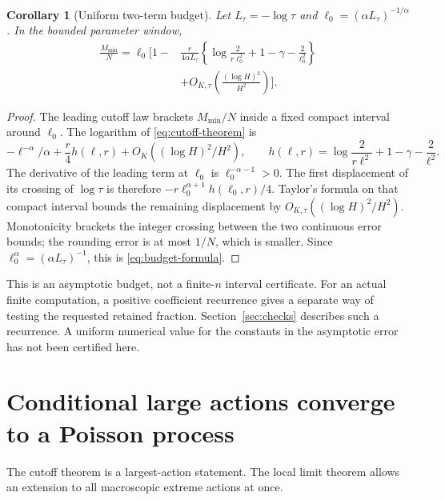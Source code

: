 \documentclass[11pt,a4paper]{article}
\numberwithin{equation}{section}
\newtheorem{corollary}[theorem]{Corollary}
\theoremstyle{definition}
\theoremstyle{remark}
\begin{document}
\begin{corollary}[Uniform two-term budget]
\label{cor:budget}
Let \(L_\tau=-\log\tau\) and
\(\ell_0=(\alpha L_\tau)^{-1/\alpha}\). In the bounded parameter window,
\begin{align}
 \frac{M_{\min}}N
 =\ell_0\biggl[1-&\frac{r}{4\alpha L_\tau}
 \left\{\log\frac{2}{r\ell_0^2}+1-\gamma-\frac2{\ell_0^2}\right\}
 \nonumber\\
 &+O_{K,\tau}\left(\frac{(\log H)^2}{H^2}\right)\biggr].
 \label{eq:budget-formula}
\end{align}
\end{corollary}
\begin{proof}
The leading cutoff law brackets \(M_{\min}/N\) inside a fixed compact
interval around \(\ell_0\). The logarithm of
\eqref{eq:cutoff-theorem} is
\[
 -\ell^{-\alpha}/\alpha
 +\frac r4 h(\ell,r)+O_K((\log H)^2/H^2),\qquad
 h(\ell,r)=\log\frac{2}{r\ell^2}+1-\gamma-\frac2{\ell^2}.
\]
The derivative of the leading term at \(\ell_0\) is
\(\ell_0^{-\alpha-1}>0\). The first displacement of its crossing of
\(\log\tau\) is therefore
\(-r\ell_0^{\alpha+1}h(\ell_0,r)/4\).
Taylor's formula on that compact interval bounds the remaining displacement
by \(O_{K,\tau}((\log H)^2/H^2)\). Monotonicity brackets the integer
crossing between the two continuous error bounds; the rounding error is
at most \(1/N\), which is smaller. Since
\(\ell_0^\alpha=(\alpha L_\tau)^{-1}\), this is
\eqref{eq:budget-formula}.
\end{proof}

This is an asymptotic budget, not a finite-\(n\) interval certificate.
For an actual finite computation, a positive coefficient recurrence gives a
separate way of testing the requested retained fraction. Section~\ref{sec:checks}
describes such a recurrence. A uniform numerical value for the constants in
the asymptotic error has not been certified here.

\section{Conditional large actions converge to a Poisson process}
\label{sec:extremes}

The cutoff theorem is a largest-action statement. The local limit theorem
allows an extension to all macroscopic extreme actions at once.
\end{document}
